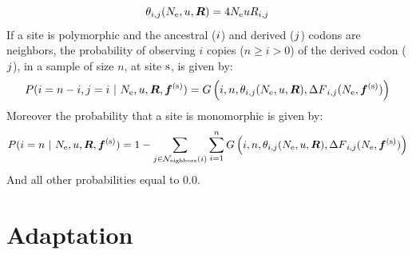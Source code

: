 \begin{equation}
\theta_{{i}, {j}}(N_{\textrm{e}}, u, \bm{R}) = 4 N_{\textrm{e}} u R_{{i}, {j}}
\end{equation}
If a site is \gls{polymorphic} and the ancestral (${i}$) and derived (${j}$) \glspl{codon} are neighbors, the probability of observing $i$ copies ($n \geq i > 0$) of the derived \gls{codon} (${j}$), in a sample of size $n$, at site $\text{s}$, is given by:
\begin{equation}
P({i}=n-i,{j}=i \ |\ N_{\textrm{e}}, u, \bm{R}, \bm{f}^{(\text{s})}) = G\left(i, n, \theta_{{i}, {j}}(N_{\textrm{e}}, u, \bm{R}), {\Delta F}_{{i}, {j}}(N_{\textrm{e}}, \bm{f}^{(\text{s})}) \right)
\end{equation}
Moreover the probability that a site is monomorphic is given by:
\begin{equation}
P({i}= n \ |\ N_{\textrm{e}}, u, \bm{R}, \bm{f}^{(\text{s})}) = 1 - \sum_{{j} \in \mathcal{N}_{\mathrm{eighbors}}\left({i}\right)} \sum_{i=1}^{n} G\left(i, n, \theta_{{i}, {j}}(N_{\textrm{e}}, u, \bm{R}), {\Delta F}_{{i}, {j}}(N_{\textrm{e}}, \bm{f}^{(\text{s})})\right)
\end{equation}
And all other probabilities equal to $0.0$.

\section{Adaptation}

